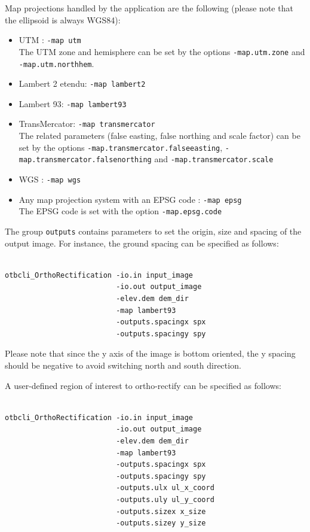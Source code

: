 Map projections handled by the application are the following
(please note that the ellipsoid is always WGS84):
\begin{itemize}
\item UTM : \verb?-map utm? \\
The UTM zone and hemisphere can be set by the options \verb?-map.utm.zone? and \verb?-map.utm.northhem?.
\item Lambert 2 etendu: \verb?-map lambert2?
\item Lambert 93: \verb?-map lambert93?
\item TransMercator: \verb?-map transmercator? \\
The related parameters (false easting, false northing and scale factor) can be set by the
options \verb?-map.transmercator.falseeasting?, \verb?-map.transmercator.falsenorthing? and
\verb?-map.transmercator.scale?
\item WGS : \verb?-map wgs?
\item Any map projection system with an EPSG code : \verb?-map epsg? \\
The EPSG code is set with the option \verb?-map.epsg.code?
\end{itemize}

The group \verb?outputs? contains parameters to set the origin, size and spacing of the output image.
For instance, the ground spacing can be specified as follows:

\begin{verbatim}

otbcli_OrthoRectification -io.in input_image
                          -io.out output_image
                          -elev.dem dem_dir
                          -map lambert93
                          -outputs.spacingx spx
                          -outputs.spacingy spy

\end{verbatim}

Please note that since the y axis of the image is bottom oriented, the
y spacing should be negative to avoid switching north and south direction.

A user-defined region of interest to ortho-rectify can be specified as
follows:

\begin{verbatim}

otbcli_OrthoRectification -io.in input_image
                          -io.out output_image
                          -elev.dem dem_dir
                          -map lambert93
                          -outputs.spacingx spx
                          -outputs.spacingy spy
                          -outputs.ulx ul_x_coord
                          -outputs.uly ul_y_coord
                          -outputs.sizex x_size
                          -outputs.sizey y_size

\end{verbatim}

